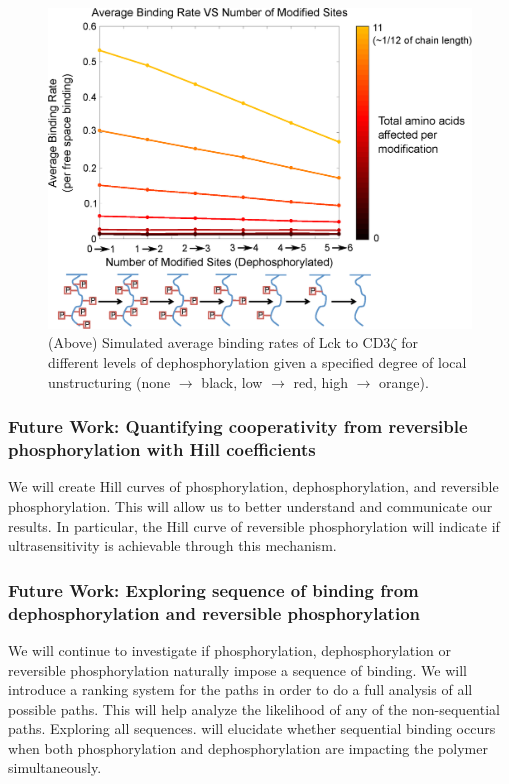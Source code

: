 \documentclass[../../AdvancementSummary.tex]{subfiles}
\begin{document}
\begin{figure}[H]
	\begin{center}
		\includegraphics[width=0.8\linewidth]{ResultsFigures/CD3ZetaStiffeningMembraneOn/Dephosphorylation/AvgBindVSTotalModified5.eps}
		\caption{(Above) Simulated average binding rates of Lck to CD3$\zeta$ for different levels of dephosphorylation given a specified degree of local unstructuring (none $\rightarrow$ black, low $\rightarrow$ red, high $\rightarrow$ orange).\label{fig: DephosMemOnCoop}}
	\end{center}
\end{figure}


\subsubsection{Future Work: Quantifying cooperativity from reversible phosphorylation with Hill coefficients}

We will create Hill curves of phosphorylation, dephosphorylation, and reversible phosphorylation. This will allow us to better understand and communicate our results. In particular, the Hill curve of reversible phosphorylation will indicate if ultrasensitivity is achievable through this mechanism. 

\subsubsection{Future Work: Exploring sequence of binding from dephosphorylation and reversible phosphorylation}

We will continue to investigate if phosphorylation, dephosphorylation or reversible phosphorylation naturally impose a sequence of binding. We will introduce a ranking system for the paths in order to do a full analysis of all possible paths. This will help analyze the likelihood of any of the non-sequential paths. Exploring all sequences. will elucidate whether sequential binding occurs when both phosphorylation and dephosphorylation are impacting the polymer simultaneously. 
\end{document}
